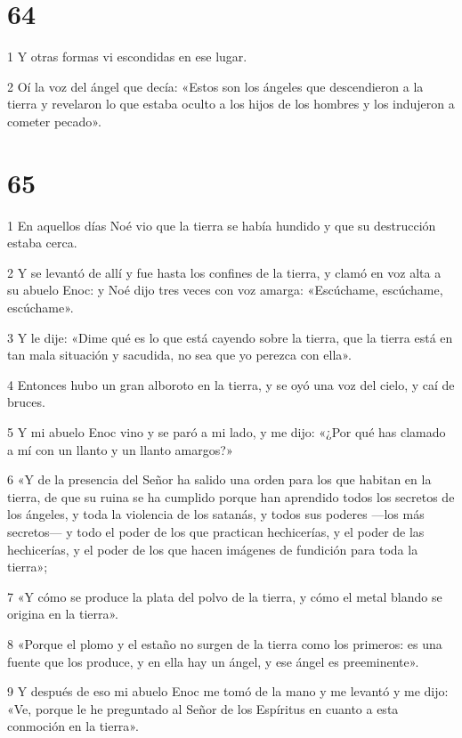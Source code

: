 \chapter{64}

\par 1 Y otras formas vi escondidas en ese lugar.
\par 2 Oí la voz del ángel que decía: «Estos son los ángeles que descendieron a la tierra y revelaron lo que estaba oculto a los hijos de los hombres y los indujeron a cometer pecado».

\chapter{65}

\par 1 En aquellos días Noé vio que la tierra se había hundido y que su destrucción estaba cerca.
\par 2 Y se levantó de allí y fue hasta los confines de la tierra, y clamó en voz alta a su abuelo Enoc: y Noé dijo tres veces con voz amarga: «Escúchame, escúchame, escúchame».
\par 3 Y le dije: «Dime qué es lo que está cayendo sobre la tierra, que la tierra está en tan mala situación y sacudida, no sea que yo perezca con ella».
\par 4 Entonces hubo un gran alboroto en la tierra, y se oyó una voz del cielo, y caí de bruces.
\par 5 Y mi abuelo Enoc vino y se paró a mi lado, y me dijo: «¿Por qué has clamado a mí con un llanto y un llanto amargos?»
\par 6 «Y de la presencia del Señor ha salido una orden para los que habitan en la tierra, de que su ruina se ha cumplido porque han aprendido todos los secretos de los ángeles, y toda la violencia de los satanás, y todos sus poderes —los más secretos— y todo el poder de los que practican hechicerías, y el poder de las hechicerías, y el poder de los que hacen imágenes de fundición para toda la tierra»;
\par 7 «Y cómo se produce la plata del polvo de la tierra, y cómo el metal blando se origina en la tierra».
\par 8 «Porque el plomo y el estaño no surgen de la tierra como los primeros: es una fuente que los produce, y en ella hay un ángel, y ese ángel es preeminente».
\par 9 Y después de eso mi abuelo Enoc me tomó de la mano y me levantó y me dijo: «Ve, porque le he preguntado al Señor de los Espíritus en cuanto a esta conmoción en la tierra».
